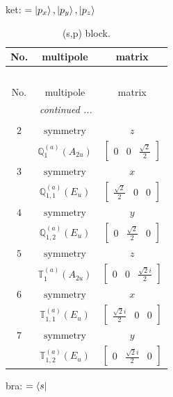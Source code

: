 \documentclass[fleqn,8pt,landscape]{jsarticle}
\begin{document}
\noindent
ket: $=\ket{p_{x}}, \ket{p_{y}}, \ket{p_{z}}$
\renewcommand{\arraystretch}{1.6}
\begin{longtable}{ccc}
\caption{(s,p) block.}
 \\
 \hline \hline
No. & multipole & matrix \\ \hline \endfirsthead

\multicolumn{2}{l}{\tablename\ \thetable{}} \\
 \hline \hline
No. & multipole & matrix \\ \hline \endhead

 \hline \hline
\multicolumn{2}{r}{\footnotesize\it continued ...} \\ \endfoot

 \hline \hline
\multicolumn{2}{r}{} \\ \endlastfoot

$ 2 $ & $ \text{symmetry} $ & $ z $ \\
$  $ & $ \mathbb{Q}_{1}^{(a)}(A_{2u}) $ & $ \begin{bmatrix} 0 & 0 & \frac{\sqrt{2}}{2} \end{bmatrix} $ \\ \hline
$ 3 $ & $ \text{symmetry} $ & $ x $ \\
$  $ & $ \mathbb{Q}_{1,1}^{(a)}(E_{u}) $ & $ \begin{bmatrix} \frac{\sqrt{2}}{2} & 0 & 0 \end{bmatrix} $ \\ \hline
$ 4 $ & $ \text{symmetry} $ & $ y $ \\
$  $ & $ \mathbb{Q}_{1,2}^{(a)}(E_{u}) $ & $ \begin{bmatrix} 0 & \frac{\sqrt{2}}{2} & 0 \end{bmatrix} $ \\ \hline
$ 5 $ & $ \text{symmetry} $ & $ z $ \\
$  $ & $ \mathbb{T}_{1}^{(a)}(A_{2u}) $ & $ \begin{bmatrix} 0 & 0 & \frac{\sqrt{2} i}{2} \end{bmatrix} $ \\ \hline
$ 6 $ & $ \text{symmetry} $ & $ x $ \\
$  $ & $ \mathbb{T}_{1,1}^{(a)}(E_{u}) $ & $ \begin{bmatrix} \frac{\sqrt{2} i}{2} & 0 & 0 \end{bmatrix} $ \\ \hline
$ 7 $ & $ \text{symmetry} $ & $ y $ \\
$  $ & $ \mathbb{T}_{1,2}^{(a)}(E_{u}) $ & $ \begin{bmatrix} 0 & \frac{\sqrt{2} i}{2} & 0 \end{bmatrix} $ \\ \hline
\end{longtable}
bra: $=\bra{s}$
\end{document}
